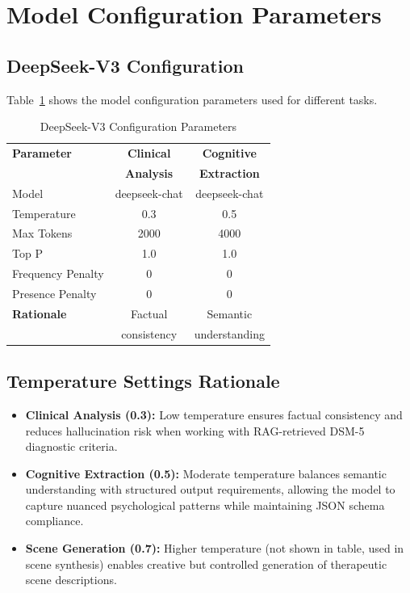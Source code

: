 \documentclass[sigconf,review,anonymous]{acmart}
\begin{document}
\section{Model Configuration Parameters}
\label{sec:config}

\subsection{DeepSeek-V3 Configuration}

Table~\ref{tab:config} shows the model configuration parameters used for different tasks.

\begin{table}[h]
\centering
\caption{DeepSeek-V3 Configuration Parameters}
\label{tab:config}
\small
\begin{tabular}{@{}lcc@{}}
\toprule
\textbf{Parameter} & \textbf{Clinical} & \textbf{Cognitive} \\
& \textbf{Analysis} & \textbf{Extraction} \\
\midrule
Model & deepseek-chat & deepseek-chat \\
Temperature & 0.3 & 0.5 \\
Max Tokens & 2000 & 4000 \\
Top P & 1.0 & 1.0 \\
Frequency Penalty & 0 & 0 \\
Presence Penalty & 0 & 0 \\
\midrule
\textbf{Rationale} & Factual & Semantic \\
& consistency & understanding \\
\bottomrule
\end{tabular}
\end{table}

\subsection{Temperature Settings Rationale}

\begin{itemize}
\item \textbf{Clinical Analysis (0.3):} Low temperature ensures factual consistency and reduces hallucination risk when working with RAG-retrieved DSM-5 diagnostic criteria.

\item \textbf{Cognitive Extraction (0.5):} Moderate temperature balances semantic understanding with structured output requirements, allowing the model to capture nuanced psychological patterns while maintaining JSON schema compliance.

\item \textbf{Scene Generation (0.7):} Higher temperature (not shown in table, used in scene synthesis) enables creative but controlled generation of therapeutic scene descriptions.
\end{itemize}
\end{document}
